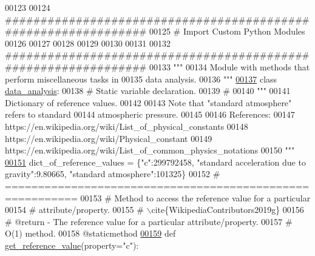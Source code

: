 \begin{DoxyCode}
{00123 
00124 \textcolor{comment}{###############################################################}
00125 \textcolor{comment}{#   Import Custom Python Modules}
00126 
00127 
00128 
00129 
00130 
00131 
00132 \textcolor{comment}{###############################################################}
00133 \textcolor{stringliteral}{"""}
00134 \textcolor{stringliteral}{    Module with methods that perform miscellaneous tasks in}
00135 \textcolor{stringliteral}{        data analysis.}
00136 \textcolor{stringliteral}{"""}
\hypertarget{data__analysis__tool_8py_source_l00137}{}\hyperlink{classstatistics_1_1data__analysis__tool_1_1data__analysis}{00137} \textcolor{keyword}{class }\hyperlink{classstatistics_1_1data__analysis__tool_1_1data__analysis}{data\_analysis}:
00138     \textcolor{comment}{#   Static variable declaration.}
00139     \textcolor{comment}{#}
00140     \textcolor{stringliteral}{"""}
00141 \textcolor{stringliteral}{        Dictionary of reference values.}
00142 \textcolor{stringliteral}{        }
00143 \textcolor{stringliteral}{        Note that "standard atmosphere" refers to standard}
00144 \textcolor{stringliteral}{            atmospheric pressure.}
00145 \textcolor{stringliteral}{        }
00146 \textcolor{stringliteral}{        References:}
00147 \textcolor{stringliteral}{            https://en.wikipedia.org/wiki/List\_of\_physical\_constants}
00148 \textcolor{stringliteral}{            https://en.wikipedia.org/wiki/Physical\_constant}
00149 \textcolor{stringliteral}{            https://en.wikipedia.org/wiki/List\_of\_common\_physics\_notations}
00150 \textcolor{stringliteral}{    """}
\hypertarget{data__analysis__tool_8py_source_l00151}{}\hyperlink{classstatistics_1_1data__analysis__tool_1_1data__analysis_a946ccd65157a8c3b3b9be607fcaed9f6}{00151}     dict\_of\_reference\_values = \{\textcolor{stringliteral}{"c"}:299792458, \textcolor{stringliteral}{"standard acceleration due to gravity"}:9.80665, \textcolor{stringliteral}{"standard
       atmosphere"}:101325\}
00152     \textcolor{comment}{# =========================================================}
00153     \textcolor{comment}{#   Method to access the reference value for a particular}
00154     \textcolor{comment}{#       attribute/property.}
00155     \textcolor{comment}{#   \(\backslash\)cite\{WikipediaContributors2019g\}}
00156     \textcolor{comment}{#   @return - The reference value for a particular attribute/property.}
00157     \textcolor{comment}{#   O(1) method.}
00158     @staticmethod
\hypertarget{data__analysis__tool_8py_source_l00159}{}\hyperlink{classstatistics_1_1data__analysis__tool_1_1data__analysis_a890a06cfd5f3dbb95a7d5e41ec89b8e9}{00159}     \textcolor{keyword}{def }\hyperlink{classstatistics_1_1data__analysis__tool_1_1data__analysis_a890a06cfd5f3dbb95a7d5e41ec89b8e9}{get\_reference\_value}(property="c"):
}
\end{DoxyCode}
